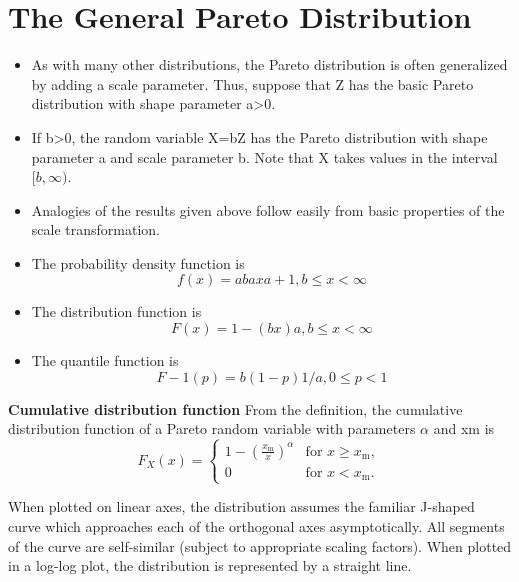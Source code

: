\documentclass[]{report}
\begin{document}
{\begin{itemize}
\end{itemize}

\newpage
\section{The General Pareto Distribution}

\begin{itemize}
\item As with many other distributions, the Pareto distribution is often generalized by adding a scale parameter. Thus, suppose that Z has the basic Pareto distribution with shape parameter a>0.
\item If b>0, the random variable X=bZ has the Pareto distribution with shape parameter a and scale parameter b. Note that X takes values in the interval $[b, \infty)$.

\item Analogies of the results given above follow easily from basic properties of the scale transformation.

\end{itemize}



\begin{itemize}
\item The probability density function is
\[ f(x)=abaxa+1,b\leq x< \infty \]
\item The distribution function is
\[F(x)=1-(bx)a,b\leq x< \infty \]


\item The quantile function is
\[F-1(p)=b(1-p)1/a,0\leq p<1\]
\end{itemize}


\noindent \textbf{Cumulative distribution function}
From the definition, the cumulative distribution function of a Pareto random variable with parameters $\alpha$ and xm is
\[F_X(x) = \begin{cases}
1-\left(\frac{x_\mathrm{m}}{x}\right)^\alpha & \mbox{for } x \ge x_\mathrm{m}, \\
0 & \mbox{for }x < x_\mathrm{m}.
\end{cases}
\]


When plotted on linear axes, the distribution assumes the familiar J-shaped curve which approaches each of the orthogonal axes asymptotically. All segments of the curve are self-similar (subject to appropriate scaling factors). When plotted in a log-log plot, the distribution is represented by a straight line.
}
\end{document}
